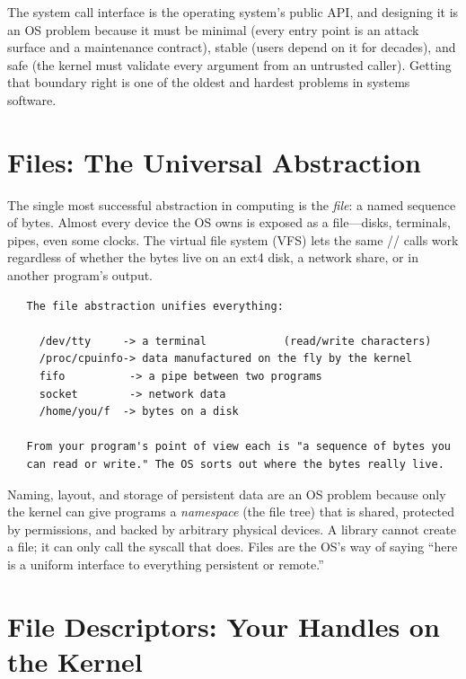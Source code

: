\begin{osconcept}
The system call interface is the operating system's public API, and
designing it is an OS problem because it must be minimal (every entry
point is an attack surface and a maintenance contract), stable (users
depend on it for decades), and safe (the kernel must validate every
argument from an untrusted caller). Getting that boundary right is one
of the oldest and hardest problems in systems software.
\end{osconcept}

\section{Files: The Universal Abstraction}

The single most successful abstraction in computing is the \emph{file}:
a named sequence of bytes. Almost every device the OS owns is exposed
as a file---disks, terminals, pipes, even some clocks. The virtual file
system (VFS) lets the same // calls
work regardless of whether the bytes live on an ext4 disk, a network
share, or in another program's output.

\begin{verbatim}
   The file abstraction unifies everything:

     /dev/tty     -> a terminal            (read/write characters)
     /proc/cpuinfo-> data manufactured on the fly by the kernel
     fifo          -> a pipe between two programs
     socket        -> network data
     /home/you/f  -> bytes on a disk

   From your program's point of view each is "a sequence of bytes you
   can read or write." The OS sorts out where the bytes really live.
\end{verbatim}

\begin{osconcept}
Naming, layout, and storage of persistent data are an OS problem
because only the kernel can give programs a \emph{namespace} (the file
tree) that is shared, protected by permissions, and backed by arbitrary
physical devices. A library cannot create a file; it can only call the
syscall that does. Files are the OS's way of saying ``here is a uniform
interface to everything persistent or remote.''
\end{osconcept}

\section{File Descriptors: Your Handles on the Kernel}

